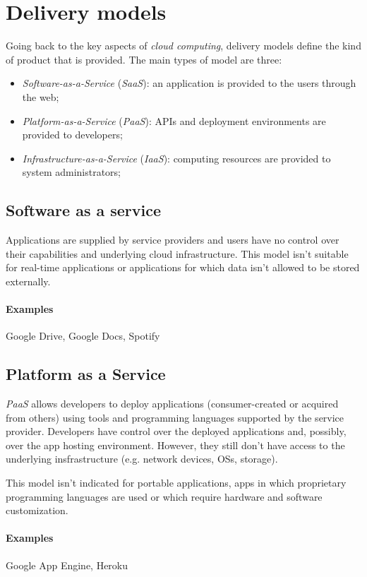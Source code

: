 \section{Delivery models}
Going back to the key aspects of \emph{cloud computing}, delivery models define
the kind of product that is provided. The main types of model are three:
\begin{itemize}
    \item \emph{Software-as-a-Service} (\emph{SaaS}): an application is provided
    to the users through the web;
    \item \emph{Platform-as-a-Service} (\emph{PaaS}): APIs and deployment
    environments are provided to developers;
    \item \emph{Infrastructure-as-a-Service} (\emph{IaaS}): computing resources
    are provided to system administrators;
\end{itemize}

\subsection{Software as a service}
Applications are supplied by service providers and users have no control over their
capabilities and underlying cloud infrastructure. This model isn't suitable for
real-time applications or applications for which data isn't allowed to be stored
externally.

\paragraph{Examples} Google Drive, Google Docs, Spotify

\subsection{Platform as a Service}
\emph{PaaS} allows developers to deploy applications (consumer-created or acquired
from others) using tools and programming languages supported by the service
provider. Developers have control over the deployed applications and, possibly,
over the app hosting environment. However, they still don't have access to the
underlying insfrastructure (e.g. network devices, OSs, storage).


This model isn't indicated for portable applications, apps in which proprietary
programming languages are used or which require hardware and software customization.

\paragraph{Examples} Google App Engine, Heroku

